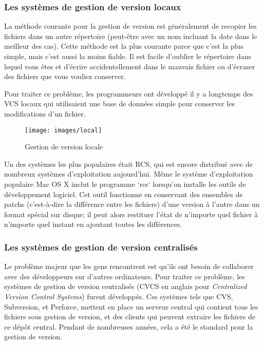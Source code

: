 \subsubsection{Les systèmes de gestion de version locaux}

La méthode courante pour la gestion de version est généralement de recopier les fichiers dans un autre répertoire (peut-être avec un nom incluant la date dans le meilleur des cas).
Cette méthode est la plus courante parce que c'est la plus simple, mais c'est aussi la moins fiable.
Il est facile d'oublier le répertoire dans lequel vous êtes et d'écrire accidentellement dans le mauvais fichier ou d'écraser des fichiers que vous vouliez conserver.

Pour traiter ce problème, les programmeurs ont développé il y a longtemps des VCS locaux qui utilisaient une base de données simple pour conserver les modifications d'un fichier.

\begin{figure}[H]
  \centering
  \texttt{[image: images/local]}
  \caption{Gestion de version locale}
  \label{fig:git:local}
\end{figure}

Un des systèmes les plus populaires était RCS, qui est encore distribué avec de nombreux systèmes d'exploitation aujourd'hui.
Même le système d'exploitation populaire Mac OS X inclut le programme `rcs` lorsqu'on installe les outils de développement logiciel.
Cet outil fonctionne en conservant des ensembles de patchs (c'est-à-dire la différence entre les fichiers) d'une version à l'autre dans un format spécial sur disque;
il peut alors restituer l'état de n'importe quel fichier à n'importe quel instant en ajoutant toutes les différences.

\subsubsection{Les systèmes de gestion de version centralisés}


Le problème majeur que les gens rencontrent est qu'ils ont besoin de collaborer avec des développeurs sur d'autres ordinateurs.
Pour traiter ce problème, les systèmes de gestion de version centralisés (CVCS en anglais pour \emph{Centralized Version Control Systems}) furent développés.
Ces systèmes tels que CVS, Subversion, et Perforce, mettent en place un serveur central qui contient tous les fichiers sous gestion de version, et des clients qui peuvent extraire les fichiers de ce dépôt central.
Pendant de nombreuses années, cela a été le standard pour la gestion de version.

